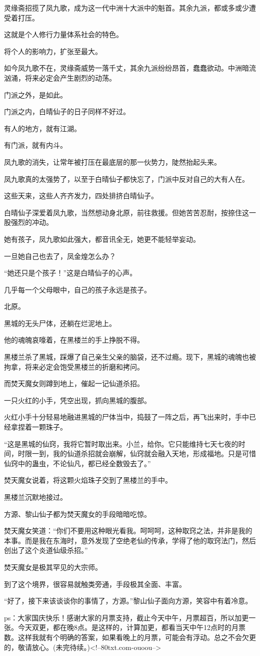 \begin{this_body}
灵缘斋招揽了凤九歌，成为这一代中洲十大派中的魁首。其余九派，都或多或少遭受着打压。

这就是个人修行力量体系社会的特色。

将个人的影响力，扩张至最大。

如今凤九歌不在，灵缘斋威势一落千丈，其余九派纷纷昂首，蠢蠢欲动。中洲暗流汹涌，将来必定会产生剧烈的动荡。

门派之外，是如此。

门派之内，白晴仙子的日子同样不好过。

有人的地方，就有江湖。

有门派，就有内斗。

凤九歌的消失，让常年被打压在最底层的那一伙势力，陡然抬起头来。

凤九歌真的太强势了，以至于白晴仙子都快忘了，门派中反对自己的大有人在。

这些天来，这些人齐齐发力，四处排挤白晴仙子。

白晴仙子深爱着凤九歌，当然想动身北原，前往救援。但她苦苦忍耐，按捺住这一股强烈的冲动。

她有孩子，凤九歌如此强大，都音讯全无，她更不能轻举妄动。

一旦她自己也去了，凤金煌怎么办？

“她还只是个孩子！”这是白晴仙子的心声。

几乎每一个父母眼中，自己的孩子永远是孩子。

北原。

黑城的无头尸体，还躺在烂泥地上。

他的魂魄哀嚎着，在黑楼兰的手上挣脱不得。

黑楼兰杀了黑城，踩爆了自己亲生父亲的脑袋，还不过瘾。现下，黑城的魂魄也被拘拿，将来必定会饱受黑楼兰的折磨和拷问。

而焚天魔女则蹲到地上，催起一记仙道杀招。

一只火红的小手，凭空出现，抓向黑城的腹部。

火红小手十分轻易地融进黑城的尸体当中，捣鼓了一阵之后，再飞出来时，手中已经拿捏着一颗珠子。

“这是黑城的仙窍，我将它暂时取出来。小兰，给你。它只能维持七天七夜的时间，时限一到，我的仙道杀招就会崩解，仙窍就会融入天地，形成福地。只是可惜仙窍中的蛊虫，不论仙凡，都已经全数毁去了。”

焚天魔女说着，将这颗火焰珠子交到了黑楼兰的手中。

黑楼兰沉默地接过。

方源、黎山仙子都为焚天魔女的手段暗暗吃惊。

焚天魔女笑道：“你们不要用这种眼光看我。呵呵呵，这种取窍之法，并非是我的本事。而是我在东海时，意外发现了空绝老仙的传承，学得了他的取窍法门，然后创出了这个炎道仙级杀招。”

焚天魔女是极其罕见的大宗师。

到了这个境界，很容易就触类旁通，手段极其全面、丰富。

“好了，接下来该谈谈你的事情了，方源。”黎山仙子面向方源，笑容中有着冷意。

ps：大家国庆快乐！感谢大家的月票支持，截止今天中午，月票超百，所以加更一张。今天双更，都在晚8点。是这样的，计算加更，都看当天中午12点时的月票数。这样我就有个明确的答案，如果看晚上的月票，可能会有浮动。总之不会欠更的，敬请放心。(未完待续。)<!--80txt.com-ouoou-->

\end{this_body}

